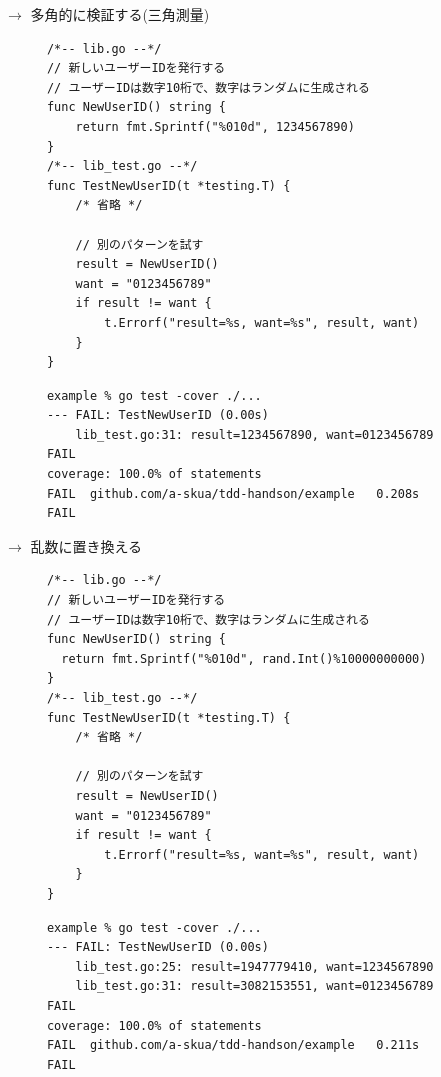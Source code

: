 \documentclass[aspectratio=169]{beamer}
\begin{document}
\begin{frame}[fragile]
  $\rightarrow$
  多角的に検証する(三角測量)
  {
    \scriptsize
    \begin{verbatim}
      /*-- lib.go --*/
      // 新しいユーザーIDを発行する
      // ユーザーIDは数字10桁で、数字はランダムに生成される
      func NewUserID() string {
          return fmt.Sprintf("%010d", 1234567890)
      }
      /*-- lib_test.go --*/
      func TestNewUserID(t *testing.T) {
          /* 省略 */

          // 別のパターンを試す
          result = NewUserID()
          want = "0123456789"
          if result != want {
              t.Errorf("result=%s, want=%s", result, want)
          }
      }
    \end{verbatim}
  }
  {
    \color{gray}
    \scriptsize
    \begin{verbatim}
      example % go test -cover ./...
      --- FAIL: TestNewUserID (0.00s)
          lib_test.go:31: result=1234567890, want=0123456789
      FAIL
      coverage: 100.0% of statements
      FAIL	github.com/a-skua/tdd-handson/example	0.208s
      FAIL
    \end{verbatim}
  }
\end{frame}

\begin{frame}[fragile]
  $\rightarrow$
  乱数に置き換える
  {
    \scriptsize
    \begin{verbatim}
      /*-- lib.go --*/
      // 新しいユーザーIDを発行する
      // ユーザーIDは数字10桁で、数字はランダムに生成される
      func NewUserID() string {
        return fmt.Sprintf("%010d", rand.Int()%10000000000)
      }
      /*-- lib_test.go --*/
      func TestNewUserID(t *testing.T) {
          /* 省略 */

          // 別のパターンを試す
          result = NewUserID()
          want = "0123456789"
          if result != want {
              t.Errorf("result=%s, want=%s", result, want)
          }
      }
    \end{verbatim}
  }
  {
    \color{gray}
    \scriptsize
    \begin{verbatim}
      example % go test -cover ./...
      --- FAIL: TestNewUserID (0.00s)
          lib_test.go:25: result=1947779410, want=1234567890
          lib_test.go:31: result=3082153551, want=0123456789
      FAIL
      coverage: 100.0% of statements
      FAIL	github.com/a-skua/tdd-handson/example	0.211s
      FAIL
    \end{verbatim}
  }
\end{frame}
\end{document}
